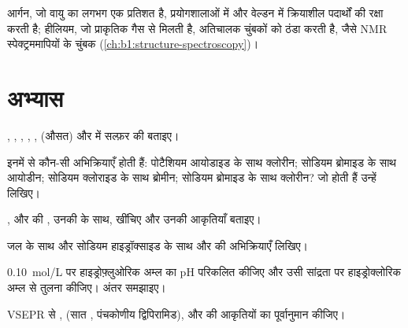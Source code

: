आर्गन, जो वायु का लगभग एक प्रतिशत है, प्रयोगशालाओं में और वेल्डन में क्रियाशील पदार्थों की
रक्षा करती है; हीलियम, जो प्राकृतिक गैस से मिलती है, अतिचालक चुंबकों को ठंडा करती है, जैसे
NMR स्पेक्ट्रममापियों के चुंबक (\cref{ch:b1:structure-spectroscopy})।

\section{अभ्यास}

\begin{exercise}[$\star$]\label{exo:b1:p-block-16-18:1}
, , ,
, ,  (औसत) और  में सल्फ़र की  बताइए।
\end{exercise}

\begin{exercise}[$\star$]\label{exo:b1:p-block-16-18:2}
इनमें से कौन-सी अभिक्रियाएँ होती हैं: पोटैशियम आयोडाइड के साथ क्लोरीन; सोडियम ब्रोमाइड के साथ
आयोडीन; सोडियम क्लोराइड के साथ ब्रोमीन; सोडियम ब्रोमाइड के साथ क्लोरीन?
जो होती हैं उन्हें लिखिए।
\end{exercise}

\begin{exercise}[$\star$]\label{exo:b1:p-block-16-18:3}
,  और  की , उनकी
 के साथ, खींचिए और उनकी आकृतियाँ बताइए।
\end{exercise}

\begin{exercise}[$\star$]\label{exo:b1:p-block-16-18:4}
जल के साथ और सोडियम हाइड्रॉक्साइड के साथ  और  की
अभिक्रियाएँ लिखिए।
\end{exercise}

\begin{exercise}[$\star\star$]\label{exo:b1:p-block-16-18:5}
\qty{0.10}{mol/L} पर हाइड्रोफ़्लुओरिक अम्ल का pH परिकलित कीजिए और उसी सांद्रता पर
हाइड्रोक्लोरिक अम्ल से तुलना कीजिए। अंतर समझाइए।
\end{exercise}

\begin{exercise}[$\star\star$]\label{exo:b1:p-block-16-18:6}
VSEPR से ,  (सात ,
पंचकोणीय द्विपिरामिड),  और  की आकृतियों का पूर्वानुमान कीजिए।
\end{exercise}

